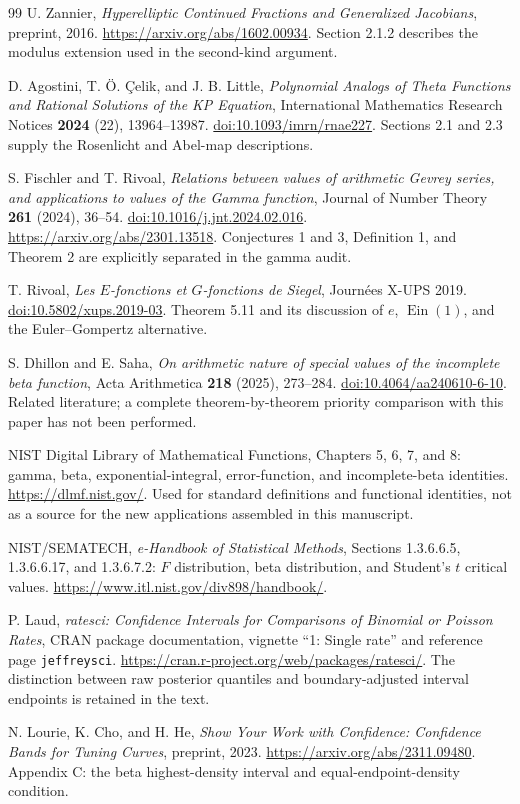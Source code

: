\documentclass[11pt,a4paper]{article}
\numberwithin{equation}{section}
\theoremstyle{definition}
\theoremstyle{remark}
\newcommand{\Ein}{\operatorname{Ein}}
\begin{document}
\begin{thebibliography}{99}
U. Zannier, \emph{Hyperelliptic Continued Fractions and Generalized
Jacobians}, preprint, 2016. \url{https://arxiv.org/abs/1602.00934}.
Section 2.1.2 describes the modulus extension used in the second-kind
argument.

D. Agostini, T. \"O. \c{C}elik, and J. B. Little,
\emph{Polynomial Analogs of Theta Functions and Rational Solutions of the
KP Equation}, International Mathematics Research Notices
\textbf{2024} (22), 13964--13987.
\href{https://doi.org/10.1093/imrn/rnae227}{doi:10.1093/imrn/rnae227}.
Sections 2.1 and 2.3 supply the Rosenlicht and Abel-map descriptions.

S. Fischler and T. Rivoal, \emph{Relations between values of arithmetic
Gevrey series, and applications to values of the Gamma function}, Journal
of Number Theory \textbf{261} (2024), 36--54.
\href{https://doi.org/10.1016/j.jnt.2024.02.016}{doi:10.1016/j.jnt.2024.02.016}.
\url{https://arxiv.org/abs/2301.13518}.
Conjectures 1 and 3, Definition 1, and Theorem 2 are explicitly separated
in the gamma audit.

T. Rivoal, \emph{Les $E$-fonctions et $G$-fonctions de Siegel},
Journ\'ees X-UPS 2019.
\href{https://doi.org/10.5802/xups.2019-03}{doi:10.5802/xups.2019-03}.
Theorem 5.11 and its discussion of $e$, $\Ein(1)$, and the
Euler--Gompertz alternative.

S. Dhillon and E. Saha, \emph{On arithmetic nature of special values of
the incomplete beta function}, Acta Arithmetica \textbf{218} (2025),
273--284.
\href{https://doi.org/10.4064/aa240610-6-10}{doi:10.4064/aa240610-6-10}.
Related literature; a complete theorem-by-theorem priority comparison
with this paper has not been performed.

NIST Digital Library of Mathematical Functions, Chapters 5, 6, 7, and 8:
gamma, beta, exponential-integral, error-function, and incomplete-beta
identities. \url{https://dlmf.nist.gov/}.
Used for standard definitions and functional identities, not as a source
for the new applications assembled in this manuscript.

NIST/SEMATECH, \emph{e-Handbook of Statistical Methods}, Sections
1.3.6.6.5, 1.3.6.6.17, and 1.3.6.7.2: $F$ distribution, beta distribution,
and Student's $t$ critical values.
\url{https://www.itl.nist.gov/div898/handbook/}.

P. Laud, \emph{ratesci: Confidence Intervals for Comparisons of Binomial
or Poisson Rates}, CRAN package documentation, vignette ``1: Single
rate'' and reference page \texttt{jeffreysci}.
\url{https://cran.r-project.org/web/packages/ratesci/}.
The distinction between raw posterior quantiles and boundary-adjusted
interval endpoints is retained in the text.

N. Lourie, K. Cho, and H. He, \emph{Show Your Work with Confidence:
Confidence Bands for Tuning Curves}, preprint, 2023.
\url{https://arxiv.org/abs/2311.09480}.
Appendix C: the beta highest-density interval and equal-endpoint-density
condition.
\end{thebibliography}
\end{document}
